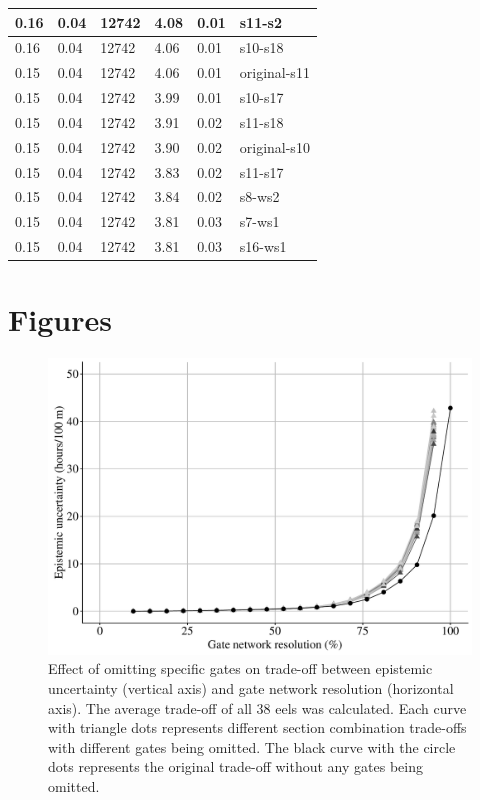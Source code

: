 \begin{table}
{\begin{tabular}{|l|l|l|l|l|l|}
0.16        & 0.04 & 12742 & 4.08    & 0.01    & s11-s2       \\ \hline
0.16        & 0.04 & 12742 & 4.06    & 0.01    & s10-s18      \\ \hline
0.15        & 0.04 & 12742 & 4.06    & 0.01    & original-s11 \\ \hline
0.15        & 0.04 & 12742 & 3.99    & 0.01    & s10-s17      \\ \hline
0.15        & 0.04 & 12742 & 3.91    & 0.02    & s11-s18      \\ \hline
0.15        & 0.04 & 12742 & 3.90    & 0.02    & original-s10 \\ \hline
0.15        & 0.04 & 12742 & 3.83    & 0.02    & s11-s17      \\ \hline
0.15        & 0.04 & 12742 & 3.84    & 0.02    & s8-ws2       \\ \hline
0.15        & 0.04 & 12742 & 3.81    & 0.03    & s7-ws1       \\ \hline
0.15        & 0.04 & 12742 & 3.81    & 0.03    & s16-ws1      \\ \hline
\end{tabular}
}
\end{table}

\FloatBarrier

\section{Figures}

\setcounter{table}{0} \renewcommand{\thetable}{D.\arabic{table}}
\setcounter{figure}{0} \renewcommand{\thefigure}{D.\arabic{figure}}

\begin{figure}[h!]
  \centering\includegraphics[scale=0.45]{Pareto_stations_removed_duration.pdf}
  \caption{Effect of omitting specific gates on trade-off between epistemic uncertainty (vertical axis) and gate network resolution (horizontal axis). The average trade-off of all 38 eels was calculated. Each curve with triangle dots represents different section combination trade-offs with different gates being omitted. The black curve with the circle dots represents the original trade-off without any gates being omitted.}
  \label{fig:Pareto_stations_removed}
\end{figure}

